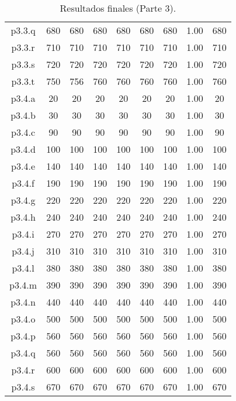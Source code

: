 \begin{table}
\begin{center}
\begin{tabular}{ |c|c|c|c|c|c|c|c|c| }
p3.3.q & 680 & 680 & 680 & 680 & 680 & 680 & 1.00 & 680 \\
p3.3.r & 710 & 710 & 710 & 710 & 710 & 710 & 1.00 & 710 \\
p3.3.s & 720 & 720 & 720 & 720 & 720 & 720 & 1.00 & 720 \\
p3.3.t & 750 & 756 & 760 & 760 & 760 & 760 & 1.00 & 760 \\
p3.4.a & 20 & 20 & 20 & 20 & 20 & 20 & 1.00 & 20 \\
p3.4.b & 30 & 30 & 30 & 30 & 30 & 30 & 1.00 & 30 \\
p3.4.c & 90 & 90 & 90 & 90 & 90 & 90 & 1.00 & 90 \\
p3.4.d & 100 & 100 & 100 & 100 & 100 & 100 & 1.00 & 100 \\
p3.4.e & 140 & 140 & 140 & 140 & 140 & 140 & 1.00 & 140 \\
p3.4.f & 190 & 190 & 190 & 190 & 190 & 190 & 1.00 & 190 \\
p3.4.g & 220 & 220 & 220 & 220 & 220 & 220 & 1.00 & 220 \\
p3.4.h & 240 & 240 & 240 & 240 & 240 & 240 & 1.00 & 240 \\
p3.4.i & 270 & 270 & 270 & 270 & 270 & 270 & 1.00 & 270 \\
p3.4.j & 310 & 310 & 310 & 310 & 310 & 310 & 1.00 & 310 \\
p3.4.l & 380 & 380 & 380 & 380 & 380 & 380 & 1.00 & 380 \\
p3.4.m & 390 & 390 & 390 & 390 & 390 & 390 & 1.00 & 390 \\
p3.4.n & 440 & 440 & 440 & 440 & 440 & 440 & 1.00 & 440 \\
p3.4.o & 500 & 500 & 500 & 500 & 500 & 500 & 1.00 & 500 \\
p3.4.p & 560 & 560 & 560 & 560 & 560 & 560 & 1.00 & 560 \\
p3.4.q & 560 & 560 & 560 & 560 & 560 & 560 & 1.00 & 560 \\
p3.4.r & 600 & 600 & 600 & 600 & 600 & 600 & 1.00 & 600 \\
p3.4.s & 670 & 670 & 670 & 670 & 670 & 670 & 1.00 & 670 \\
\hline
\end{tabular}
\end{center}
\caption{Resultados finales (Parte 3).}
\label{tab:resultadosFinales3}
\end{table}



